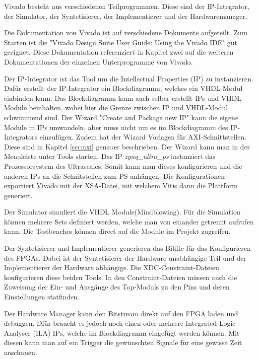 \documentclass{article}
\begin{document}
Vivado besteht aus verschiedenen Teilprogrammen. Diese sind der IP-Integrator, der Simulator, der Syntetisierer, der Implementierer und der Hardwaremanager.

Die Dokumentation von Vivado ist auf verschiedene Dokumente aufgeteilt. Zum Starten ist die "Vivado Design Suite User Guide: Using the Vivado IDE" gut geeignet. Diese Dokumentation referenziert in Kapitel zwei auf die weiteren Dokumentationen der einzelnen Unterprogramme von Vivado. 

Der IP-Integrator ist das Tool um die Intellectual Properties (IP) zu instanzieren. Dafür erstellt der IP-Integrator ein Blockdiagramm, welches ein VHDL-Modul einbinden kann. Das Blockdiagramm kann auch selber erstellt IPs und VHDL-Module beinhalten, wobei hier die Grenze zwischen IP und VHDL-Modul schwimmend sind. Der Wizard "Create and Package new IP" kann die eigene Module in IPs umwandeln, aber muss nicht um es im Blockdiagramm des IP-Integrators einzufügen. Zudem hat der Wizard Vorlagen für AXI-Schnittstellen. Diese sind in Kapitel \ref{sec:axi} genauer beschrieben. Der Wizard kann man in der Menuleiste unter Tools starten. Das IP \textit{zynq\_ultra\_ps} instanziert das Prozessorsystem des Ultrascales. Somit kann man dieses konfigurieren und die anderen IPs an die Schnitstellen zum PS anhängen. Die Konfigurationen exportiert Vivado mit der XSA-Datei, mit welchem Vitis dann die Plattform generiert. 

Der Simulator simuliert die VHDL Module(Mindblowing). Für die Simulation können mehrere Sets definiert werden, welche man von einander getrennt aufrufen kann. Die Testbenches können direct auf die Module im Projekt zugreifen.  

Der Syntetisierer und Implementierer generieren das Bitfile für das Konfigurieren des FPGAs. Dabei ist der Syntetisierer der Hardware unabhängige Teil und der Implementierer der Hardware abhängige. Die XDC-Constraint-Dateien konfigurieren diese beiden Tools. In den Constraint-Dateien müssen auch die Zuweisung der Ein- und Ausgänge des Top-Moduls zu den Pins und deren Einstellungen statfinden. 

Der Hardware Manager kann den Bitstream direkt auf den FPGA laden und debuggen. Dfür braucht es jedoch noch einen oder mehrere Integrated Logic Analyser (ILA) IPs, welche im Blockdiagramm eingefügt werden können. Mit diesen kann man auf ein Trigger die gewünschten Signale für eine gewisse Zeit anschauen. 
\end{document}

